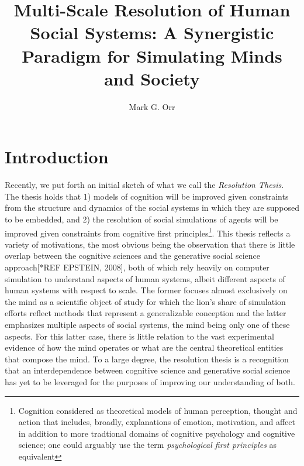 \documentclass{article}
\title{Multi-Scale Resolution of Human Social Systems:  A Synergistic Paradigm for Simulating Minds and Society}
\author{Mark G. Orr}
\begin{document}
\maketitle

\section{Introduction}
Recently, we put forth an initial sketch of what we call the \textit{Resolution Thesis}\cite{orr2018_brims}.  The thesis holds that 1) models of cognition will be improved given constraints from the structure and dynamics of the social systems in which they are supposed to be embedded, and 2) the resolution of social simulations of agents will be improved given constraints from cognitive first principles\footnote{Cognition considered as theoretical models of human perception, thought and action that includes, broadly, explanations of emotion, motivation, and affect in addition to more tradtional domains of cognitive psychology and cognitive science; one could arguably use the term \textit{psychological first principles} as equivalent}.  This thesis reflects a variety of motivations, the most obvious being the observation that there is little overlap between the cognitive sciences and the generative social science approach[*REF EPSTEIN, 2008], both of which rely heavily on computer simulation to understand aspects of human systems, albeit different aspects of human systems with respect to scale.  The former focuses almost exclusively on the mind as a scientific object of study for which the lion's share of simulation efforts reflect methods that represent a generalizable conception and the latter emphasizes multiple aspects of social systems, the mind being only one of these aspects.  For this latter case,  there is little relation to the vast experimental evidence of how the mind operates or what are the central theoretical entities that compose the mind.  To a large degree, the resolution thesis is a recognition that an interdependence between cognitive science and generative social science has yet to be leveraged for the purposes of improving our understanding of both.    
\end{document}
